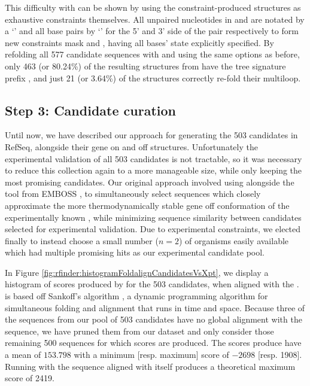 This difficulty with \rfold can be shown by using the constraint-produced
structures as exhaustive constraints themselves. All unpaired nucleotides in
\strOff and \strOn are notated by a `' and all base pairs by `\ms{()}' for
the 5' and 3' side of the pair respectively to form new constraints mask
 and , having all bases' state explicitly specified. By
refolding all 577 candidate sequences with  and  using
the same options as before, only 463 (or 80.24\%) of the resulting structures from
 have the tree signature prefix \ms{[0,1,2,2,1]}, and just 21 (or
3.64\%) of the  structures correctly re-fold their multiloop.

\subsection{Step 3: Candidate curation}
\label{subsec:rfinder:curation}

Until now, we have described our approach for generating the 503 \grb candidates
in RefSeq, alongside their gene on and off structures. Unfortunately the
experimental validation of all 503 candidates is not tractable, so it was
necessary to reduce this collection again to a more manageable size, while only
keeping the most promising candidates. Our original approach involved using
\foldalign \citep{havgaard:2007ca} alongside the  tool from EMBOSS
\citep{rice:2000wr}, to simultaneously
select sequences which closely approximate the more thermodynamically stable
gene off conformation of the experimentally known \Bsxpt \grb, while minimizing
sequence similarity between candidates selected for experimental validation. Due to
experimental constraints, we elected finally to instead choose a small number
($n = 2$) of organisms easily available which had multiple promising hits as our
experimental candidate pool.

In Figure \ref{fig:rfinder:histogramFoldalignCandidatesVsXpt}, we display a histogram of scores produced
by \foldalign for the 503 candidates, when aligned with the \Bsxpt \grb. \foldalign
is based off Sankoff's algorithm \citep{sankoff:1985wc}, a dynamic programming
algorithm for simultaneous folding and alignment that runs in  time and
 space. Because three of the sequences from our pool of 503 candidates have
no global alignment with the \Bsxpt sequence, we have pruned them from our
dataset and only consider those remaining 500 sequences for which \foldalign
scores are produced. The \foldalign scores produce have a mean of $153.798$ with a
minimum [resp. maximum] score of $-2698$ [resp. 1908]. Running \foldalign with the
\Bsxpt sequence aligned with itself produces a theoretical maximum score of 2419.

